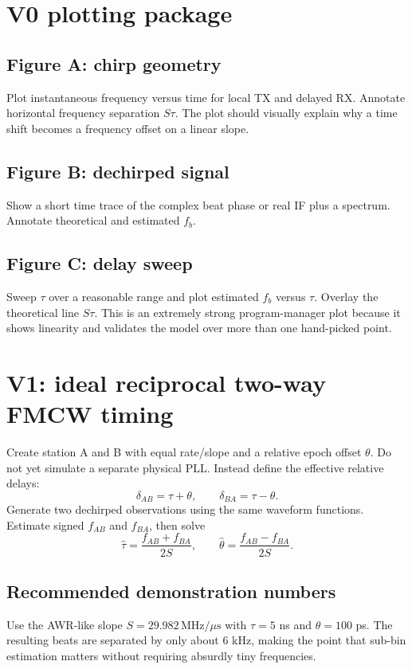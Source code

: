 \documentclass[11pt]{article}
\begin{document}
\section{V0 plotting package}
\subsection{Figure A: chirp geometry}
Plot instantaneous frequency versus time for local TX and delayed RX. Annotate horizontal frequency separation $S\tau$. The plot should visually explain why a time shift becomes a frequency offset on a linear slope.

\subsection{Figure B: dechirped signal}
Show a short time trace of the complex beat phase or real IF plus a spectrum. Annotate theoretical and estimated $f_b$.

\subsection{Figure C: delay sweep}
Sweep $\tau$ over a reasonable range and plot estimated $f_b$ versus $\tau$. Overlay the theoretical line $S\tau$. This is an extremely strong program-manager plot because it shows linearity and validates the model over more than one hand-picked point.

\section{V1: ideal reciprocal two-way FMCW timing}
Create station A and B with equal rate/slope and a relative epoch offset $\theta$. Do not yet simulate a separate physical PLL. Instead define the effective relative delays:
\[
\delta_{AB}=\tau+\theta,\qquad
\delta_{BA}=\tau-\theta.
\]
Generate two dechirped observations using the same waveform functions. Estimate signed $f_{AB}$ and $f_{BA}$, then solve
\[
\hat\tau=\frac{f_{AB}+f_{BA}}{2S},\qquad
\hat\theta=\frac{f_{AB}-f_{BA}}{2S}.
\]

\subsection{Recommended demonstration numbers}
Use the AWR-like slope $S=29.982\,\mathrm{MHz}/\mu\mathrm{s}$ with $\tau=5$ ns and $\theta=100$ ps. The resulting beats are separated by only about 6 kHz, making the point that sub-bin estimation matters without requiring absurdly tiny frequencies.
\end{document}
